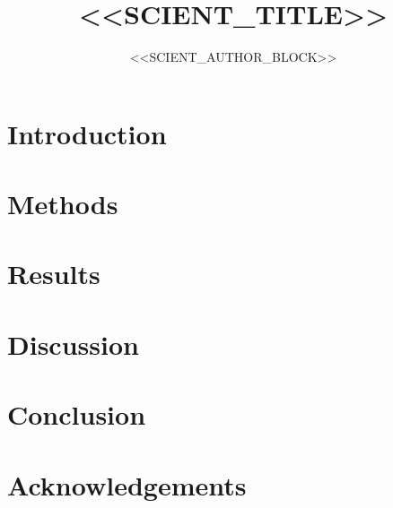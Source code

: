 \documentclass[11pt,a4paper]{article}
\title{<<SCIENT_TITLE>>}
\author{<<SCIENT_AUTHOR_BLOCK>>}
\date{}
\theoremstyle{definition}
\theoremstyle{remark}
\begin{document}
\maketitle

\begin{abstract}
\end{abstract}

\section{Introduction}
\par

\section{Methods}
\par

\section{Results}
\par

\section{Discussion}
\par

\section{Conclusion}
\par

\section*{Acknowledgements}
\par



\end{document}
